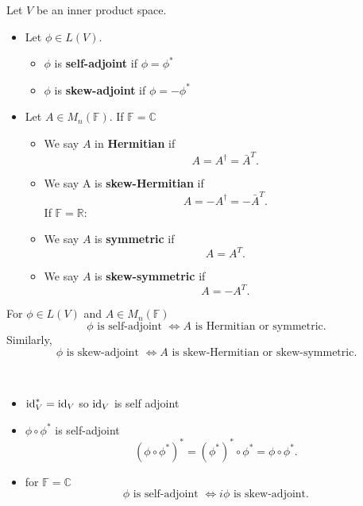 \begin{definition}
    Let $V$ be an inner product space.

    \begin{itemize}
      \item Let $\phi \in L(V)$. 
        \begin{itemize}
          \item $\phi$ is {\bf self-adjoint} if $\phi = \phi^*$
          \item $\phi$ is {\bf skew-adjoint} if $\phi = -\phi^*$
        \end{itemize}
    
      \item Let $A \in M_n(\mathbb{F})$. If $\mathbb{F} = \mathbb{C}$
        \begin{itemize}
            
      \item  We say $A$ in {\bf Hermitian} if
        \[A = A^\dag = \bar{A}^T.\]
    \item We say A is {\bf skew-Hermitian} if
        \[A = - A^\dag = - \bar{A}^T.\]
        If $\mathbb{F} =\mathbb{R}$:
      \item We say $A$ is {\bf symmetric} if
        \[A = A^T.\]
      \item We say $A$ is {\bf skew-symmetric} if
        \[A = - A^T.\]

        \end{itemize}
    \end{itemize}
\end{definition}

\begin{remark}
  For $\phi \in L(V)$ and $A \in M_n(\mathbb{F})$
    \[\phi \text{ is self-adjoint } \iff A \text{ is Hermitian or symmetric}.\]
    Similarly,
    \[\phi \text{ is skew-adjoint } \iff A \text{ is skew-Hermitian or skew-symmetric}.\]
\end{remark}

\begin{example} $ $
  \begin{itemize}
    \item $\mathrm{id}_V^* = \mathrm{id}_V$ so $\mathrm{id}_V$ is self adjoint
    \item $\phi \circ \phi^*$ is self-adjoint
      \[(\phi \circ \phi^*)^* = (\phi^*)^* \circ \phi^* = \phi \circ \phi^*.\]
    \item for $\mathbb{F} = \mathbb{C}$ 
      \[\phi \text{ is self-adjoint } \iff  i\phi \text{ is skew-adjoint}.\]
  \end{itemize}    
\end{example}

